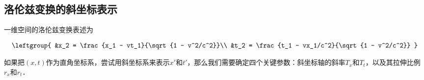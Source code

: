 
\subsection{洛伦兹变换的斜坐标表示}

一维空间的洛伦兹变换表述为

\begin{equation}\label{SROb_eq1}
\leftgroup{
&x_2 = \frac{x_1 - vt_1}{\sqrt{1 - v^2/c^2}}\\

&t_2 = \frac{t_1 - vx_1/c^2}{\sqrt{1 - v^2/c^2}}
}
\end{equation}

如果把$(x,t)$作为直角坐标系，尝试用斜坐标系来表示$x'$和$t'$，那么我们需要确定四个关键参数：斜坐标轴的斜率$T_x$和$T_t$，以及其拉伸比例$r_x$和$r_t$．


